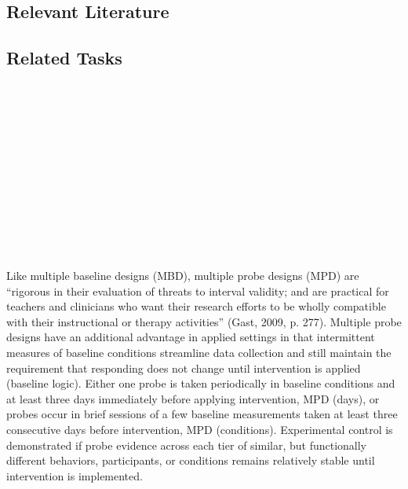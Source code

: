 \subsection{Relevant Literature}
\begin{refsection}
\nocite{cooper2007applied,
  barger2004multiple,
  carr2005recommendations,
  harris1985comparisons,
  harvey2004nonconcurrent,
  watson1981non,
  zhan2001single}
\printbibliography[heading=none]
\end{refsection}
%
\subsection{Related Tasks}
\fourbThree{}\\
\fourbFour{}\\
\fourbEight{}\\
\fourbNine{}\\
\fourbTen{}\\
\fourbEleven{}\\
\foureOne{}\\
\fourhThree{}\\
\fouriFive{}\\
\fourFKThirtyThree{}\\
%
%
%
%
%
\section{\fourbEight{}}
Like multiple baseline designs (MBD), multiple probe designs (MPD) are ``rigorous in their evaluation of threats to interval validity; and are practical for teachers and clinicians who want their research efforts to be wholly compatible with their instructional or therapy activities'' (Gast, 2009, p. 277). Multiple probe designs have an additional advantage in applied settings in that intermittent measures of baseline conditions streamline data collection and still maintain the requirement that responding does not change until intervention is applied (baseline logic). Either one probe is taken periodically in baseline conditions and at least three days immediately before applying intervention, MPD (days), or probes occur in brief sessions of a few baseline measurements taken at least three consecutive days before intervention, MPD (conditions). Experimental control is demonstrated if probe evidence across each tier of similar, but functionally different behaviors, participants, or conditions remains relatively stable until intervention is implemented. 
%
